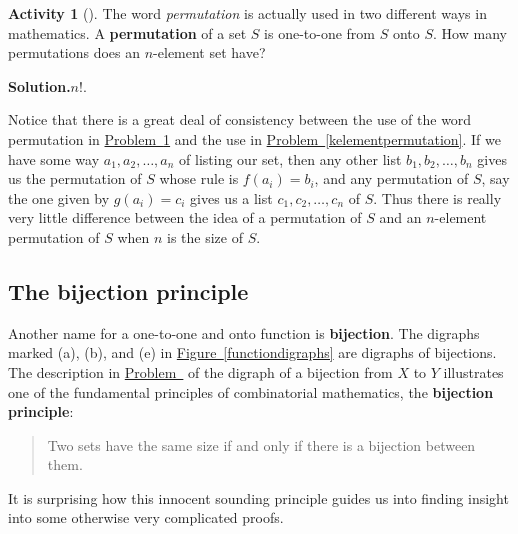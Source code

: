 \documentclass[10pt,]{book}
\newcommand{\terminology}[1]{\textbf{#1}}
\theoremstyle{plain}
\theoremstyle{definition}
\newtheorem{activity}[project]{Activity}
\numberwithin{equation}{chapter}
\begin{document}
\begin{activity}[]\label{permutationasbijection}
The word \emph{permutation} is actually used in two different ways in mathematics. A \terminology{permutation} of a set \(S\) is one-to-one from \(S\) onto \(S\). How many permutations does an \(n\)-element set have?%
\par\medskip\noindent%
\textbf{Solution.}\quad \(n!\).%
\end{activity}
Notice that there is a great deal of consistency between the use of the word permutation in \hyperref[permutationasbijection]{Problem~\ref{permutationasbijection}} and the use in \hyperref[kelementpermutation]{Problem~\ref{kelementpermutation}}. If we have some way \(a_1,a_2,\ldots,a_n\) of listing our set, then any other list \(b_1,b_2,\ldots,b_n\) gives us the permutation of \(S\) whose rule is \(f(a_i) =b_i\), and any permutation of \(S\), say the one given by \(g(a_i)=c_i\) gives us a list \(c_1,c_2,\ldots,c_n\) of \(S\). Thus there is really very little difference between the idea of a permutation of \(S\) and an \(n\)-element permutation of \(S\) when \(n\) is the size of \(S\).%
\typeout{************************************************}
\typeout{************************************************}
\subsection[{The bijection principle}]{The bijection principle}\label{subsection-3}
Another name for a one-to-one and onto function is \terminology{bijection}. The digraphs marked (a), (b), and (e) in \hyperref[functiondigraphs]{Figure~\ref{functiondigraphs}} are digraphs of bijections. The description in \hyperref[bijectiondigraph]{Problem~} of the digraph of a bijection from \(X\) to \(Y\) illustrates one of the fundamental principles of combinatorial mathematics, the \terminology{bijection principle}:%
\begin{quote}Two sets have the same size if and only if there is a bijection between them.\end{quote}
It is surprising how this innocent sounding principle guides us into finding insight into some otherwise very complicated proofs.%
\typeout{************************************************}
\typeout{************************************************}
\end{document}
